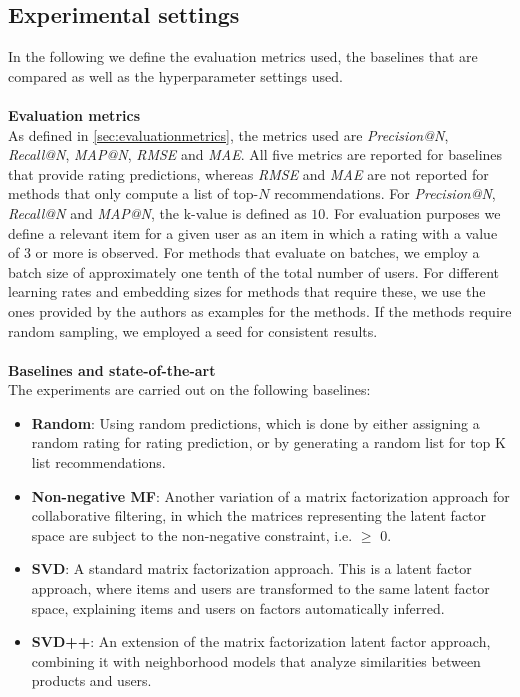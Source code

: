 \subsection{Experimental settings}
In the following we define the evaluation metrics used, the baselines that are compared as well as the hyperparameter settings used.
\\\\
\textbf{Evaluation metrics}\\
As defined in \autoref{sec:evaluationmetrics}, the metrics used are \textit{Precision@N}, \textit{Recall@N}, \textit{MAP@N}, \textit{RMSE} and \textit{MAE}.
All five metrics are reported for baselines that provide rating predictions, whereas \textit{RMSE} and \textit{MAE} are not reported for methods that only compute a list of top-$N$ recommendations.
For \textit{Precision@N}, \textit{Recall@N} and \textit{MAP@N}, the k-value is defined as $10$.
For evaluation purposes we define a relevant item for a given user as an item in which a rating with a value of $3$ or more is observed.
For methods that evaluate on batches, we employ a batch size of approximately one tenth of the total number of users.
For different learning rates and embedding sizes for methods that require these, we use the ones provided by the authors as examples for the methods. 
If the methods require random sampling, we employed a seed for consistent results.
\\\\
\textbf{Baselines and state-of-the-art}\\
The experiments are carried out on the following baselines:
\begin{itemize}
    \item \textbf{Random}: Using random predictions, which is done by either assigning a random rating for rating prediction, or by generating a random list for top K list recommendations.
    \item \textbf{Non-negative MF}: Another variation of a matrix factorization approach for collaborative filtering, in which the matrices representing the latent factor space are subject to the non-negative constraint, i.e. $\geq$ 0.
    \item \textbf{SVD}: A standard matrix factorization approach. This is a latent factor approach, where items and users are transformed to the same latent factor space, explaining items and users on factors automatically inferred.
    \item \textbf{SVD++}: An extension of the matrix factorization latent factor approach, combining it with neighborhood models that analyze similarities between products and users.
\end{itemize}

